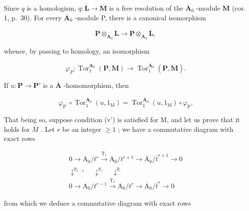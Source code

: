 Since \(q\) is a homologism, \(\overline{q}:\overline{\mathbf{L}}\to\overline{\mathbf{M}}\) is a free resolution of the \(\overline{\mathbf{A}}_{0}\) -module \(\overline{\mathbf{M}}\) (cor. 1, p.~30). For every \(\overline{\mathbf{A}}_{0}\) -module P, there is a canonical isomorphism

\[
\mathbf {P} \otimes_ {\mathbf {A} _ {0}} \mathbf {L} \rightarrow \mathbf {P} \otimes_ {\overline {{{\mathbf {A}}}} _ {0}} \overline {{{\mathbf {L}}}},
\]

whence, by passing to homology, an isomorphism

\[
\varphi_ {P}: \operatorname{Tor} _ {1} ^ {\mathbf {A} _ {0}} (\mathbf {P}, \mathbf {M}) \rightarrow \operatorname{Tor} _ {1} ^ {\overline {{\mathbf {A}}} _ {0}} (\mathbf {P}, \overline {{\mathbf {M}}}).
\]

If \(u: \mathbf{P} \to \mathbf{P}'\) is a \(\overline{\mathbf{A}}\) -homomorphism, then

\[
\varphi_ {\mathrm{P} ^ {\prime}} \circ \operatorname{Tor} _ {1} ^ {\mathbf {A} _ {0}} (u, 1 _ {\mathrm{M}}) = \operatorname{Tor} _ {1} ^ {\overline {{\mathbf {A}}} _ {0}} (u, 1 _ {\mathrm{M}}) \circ \varphi_ {\mathrm{P}}.
\]

That being so, suppose condition (v') is satisfied for M, and let us prove that it holds for \(\overline{M}\) . Let \(r\) be an integer \(\geqslant 1\) ; we have a commutative diagram with exact rows

\[
\begin{array}{c} 0 \longrightarrow \mathrm{A} _ {0} / t ^ {r} \xrightarrow {\mathrm{T} _ {1}} \mathrm{A} _ {0} / t ^ {r + 1} \longrightarrow \overline {{\mathrm{A}}} _ {0} / \overline {{t}} ^ {r + 1} \longrightarrow 0 \\ \downarrow^ {p _ {r - 1}} \quad \downarrow^ {p _ {r}} \quad \downarrow^ {\bar {p} _ {r}} \\ 0 \longrightarrow \mathrm{A} _ {0} / t ^ {r - 1} \xrightarrow {\mathrm{T} _ {1}} \mathrm{A} _ {0} / t ^ {r} \longrightarrow \overline {{\mathrm{A}}} _ {0} / \overline {{t}} ^ {r} \longrightarrow 0 \end{array}
\]

from which we deduce a commutative diagram with exact rows

